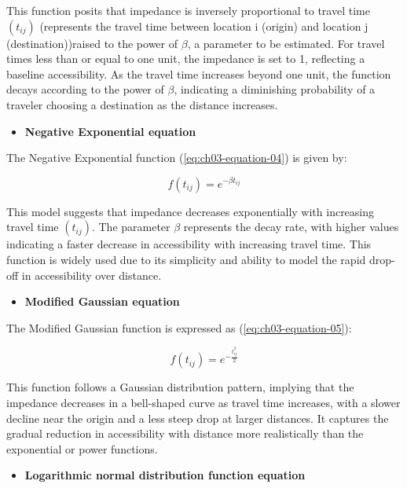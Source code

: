 \documentclass[
11pt, %
oneside, %
english, %
singlespacing, %
]{macthesis} %
\def\tightlist{}
\begin{document}
This function posits that impedance is inversely proportional to travel time \((t_{ij})\) (represents the travel time between location i (origin) and location j (destination))raised to the power of \(\beta\), a parameter to be estimated. For travel times less than or equal to one unit, the impedance is set to 1, reflecting a baseline accessibility. As the travel time increases beyond one unit, the function decays according to the power of \(\beta\), indicating a diminishing probability of a traveler choosing a destination as the distance increases.

\begin{itemize}
\tightlist
\item
  \textbf{Negative Exponential equation}
\end{itemize}

The Negative Exponential function (\ref{eq:ch03-equation-04}) is given by:

\begin{equation}
f(t_{ij}) = e^{-\beta t_{ij}}
\label{eq:ch03-equation-04}
\end{equation}

This model suggests that impedance decreases exponentially with increasing travel time \((t_{ij})\). The parameter \(\beta\) represents the decay rate, with higher values indicating a faster decrease in accessibility with increasing travel time. This function is widely used due to its simplicity and ability to model the rapid drop-off in accessibility over distance.

\begin{itemize}
\tightlist
\item
  \textbf{Modified Gaussian equation}
\end{itemize}

The Modified Gaussian function is expressed as (\ref{eq:ch03-equation-05}):

\begin{equation}
f(t_{ij}) = e^{-\frac{t_{ij}^2}{2}}
\label{eq:ch03-equation-05}
\end{equation}

This function follows a Gaussian distribution pattern, implying that the impedance decreases in a bell-shaped curve as travel time increases, with a slower decline near the origin and a less steep drop at larger distances. It captures the gradual reduction in accessibility with distance more realistically than the exponential or power functions.

\begin{itemize}
\tightlist
\item
  \textbf{Logarithmic normal distribution function equation}
\end{itemize}
\end{document}
